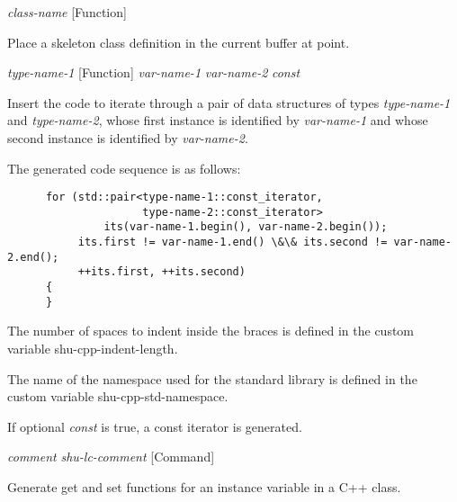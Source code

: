 \vspace{1em}
\noindent
{}
\usebox{\funcname}\emph{class-name}
 \hfill [Function]

\begin{doc-string}
Place a skeleton class definition in the current buffer at point.
\end{doc-string}

\vspace{1em}
\noindent
{}
\usebox{\funcname}\emph{type-name-1}
 \hfill [Function]
\hspace*{\wd\funcname}\emph{var-name-1} \emph{var-name-2}
\hspace*{\wd\funcname}\emph{const}

\begin{doc-string}
Insert the code to iterate through a pair of data structures of types
\emph{type-name-1} and \emph{type-name-2}, whose first instance is identified by \emph{var-name-1}
and whose second instance is identified by \emph{var-name-2}.

The generated code sequence is as follows:

\small{\begin{verbatim}
      for (std::pair<type-name-1::const_iterator,
                     type-name-2::const_iterator>
               its(var-name-1.begin(), var-name-2.begin());
           its.first != var-name-1.end() \&\& its.second != var-name-2.end();
           ++its.first, ++its.second)
      {
      }
\end{verbatim}}

The number of spaces to indent inside the braces is defined in the custom
variable shu-cpp-indent-length.

The name of the namespace used for the standard library is defined in the custom
variable shu-cpp-std-namespace.

If optional \emph{const} is true, a const iterator is generated.
\end{doc-string}

\vspace{1em}
\noindent
{}
\usebox{\funcname}\emph{comment} \emph{shu-lc-comment}
 \hfill [Command]

\begin{doc-string}
Generate get and set functions for an instance variable in a C++ class.
\end{doc-string}

